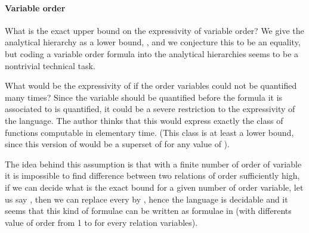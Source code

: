 \documentclass[a4paper,12pt]{article}
\theoremstyle{definition}
\begin{document}
\paragraph{Variable order}
What is the exact upper bound on the expressivity of variable
order? We give the analytical hierarchy as a lower bound,
, and we conjecture this to be an equality, but
coding a variable order formula into the analytical hierarchies seems
to be a nontrivial technical task.

What would be the expressivity of  if the order variables could not be
quantified many times? Since the variable should be quantified before
the formula it is associated to is quantified, it could be a severe
restriction to the expressivity of the language. The author thinks
that this would express exactly the class of functions computable in
elementary time. (This class is at least a lower bound, since this
version of  would be a superset of  for any value of
).

The idea behind this assumption is that with a finite number of order
of variable it is impossible to find difference between two relations
of order sufficiently high, if we can decide what is the exact bound
for a given number of order variable, let us say , then we can
replace every  by , hence the language is
decidable and it seems that this kind of formulae can be written as
formulae in (with  differents value of order from 1 to  for
every relation variables).


\end{document}
